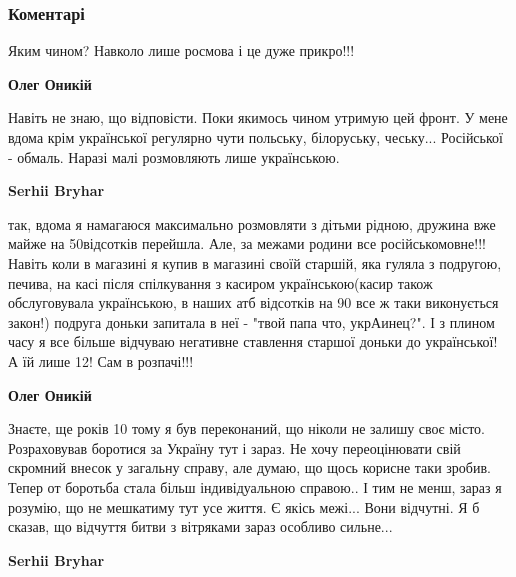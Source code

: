  
 
 
 
 
\subsubsection{Коментарі}
\label{sec:06_11_2021.fb.bryhar_sergej.1.varlamov_film_pro_ukrainu.cmt}

\begin{itemize} %
Яким чином? Навколо лише росмова і це дуже прикро!!!

\begin{itemize} %
\textbf{Олег Оникій} 

Навіть не знаю, що відповісти. Поки якимось чином утримую цей фронт. У мене
вдома крім української регулярно чути польську, білоруську, чеську...
Російської - обмаль. Наразі малі розмовляють лише українською.

\textbf{Serhii Bryhar} 

так, вдома я намагаюся максимально розмовляти з дітьми рідною, дружина вже
майже на 50відсотків перейшла. Але, за межами родини все російськомовне!!!
Навіть коли в магазині я купив в магазині своїй старшій, яка гуляла з подругою,
печива, на касі після спілкування з касиром українською(касир також
обслуговувала українською, в наших атб відсотків на 90 все ж таки виконується
закон!) подруга доньки запитала в неї - "твой папа что, укрАинец?". І з плином
часу я все більше відчуваю негативне ставлення старшої доньки до української! А
їй лише 12! Сам в розпачі!!!

\textbf{Олег Оникій} 

Знаєте, ще років 10 тому я був переконаний, що ніколи не залишу своє місто.
Розраховував боротися за Україну тут і зараз. Не хочу переоцінювати свій
скромний внесок у загальну справу, але думаю, що щось корисне таки зробив.
Тепер от боротьба стала більш індивідуальною справою.. І тим не менш, зараз я
розумію, що не мешкатиму тут усе життя. Є якісь межі... Вони відчутні. Я б
сказав, що відчуття битви з вітряками зараз особливо сильне...

\textbf{Serhii Bryhar} 


\end{itemize}
\end{itemize}
